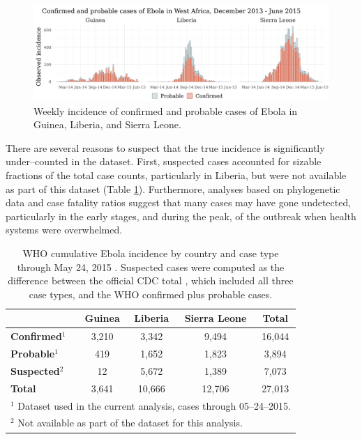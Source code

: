 \begin{figure}[htbp]
	\centering
	\includegraphics[width=\linewidth]{figures/ebola_dat}
	\caption{Weekly incidence of confirmed and probable cases of Ebola in Guinea, Liberia, and Sierra Leone.}
	\label{fig:eboladat_intro}
\end{figure}

There are several reasons to suspect that the true incidence is significantly under--counted in the dataset. First, suspected cases accounted for sizable fractions of the total case counts, particularly in  Liberia, but were not available as part of this dataset (Table \ref{tab:ebola_descriptives_intro}). Furthermore, analyses based on phylogenetic data \cite{scarpino2014epidemiological} and case fatality ratios \cite{atkins2015under,garske2017heterogeneities} suggest that many cases may have gone undetected, particularly in the early stages, and during the peak, of the outbreak when health systems were overwhelmed. 

\begin{table}[htbp]
	\caption[Ebola incidence by country and case type]{WHO cumulative Ebola incidence by country and case type through May 24, 2015 \cite{who2016eboladat}. Suspected cases were computed as the difference between the official CDC total \cite{cdc2016eboladat}, which included all three case types, and the WHO confirmed plus probable cases.}
	\label{tab:ebola_descriptives_intro}
	\small
	\centering
	\begin{tabular}{lcccc}	
		\hline	
		& \textbf{Guinea} & \textbf{Liberia} & \textbf{Sierra Leone} & \textbf{Total} \\\hline
		\textbf{Confirmed}$ ^1 $ & 3,210 & 3,342 & 9,494 & 16,044\\ 
		\textbf{Probable}$ ^1 $ & 419 & 1,652 & 1,823 & 3,894 \\
		\textbf{Suspected$ ^2 $} & 12 & 5,672 & 1,389 & 7,073 \\
		\hline
		\textbf{Total} & 3,641 & 10,666 & 12,706 & 27,013 \\
		\hline
		\multicolumn{5}{l}{\scriptsize $ ^1 $ Dataset used in the current analysis, cases through 05--24--2015.}\\
		\multicolumn{5}{l}{\scriptsize $ ^2 $ Not available as part of the dataset for this analysis.}\\
	\end{tabular} 
\end{table}

